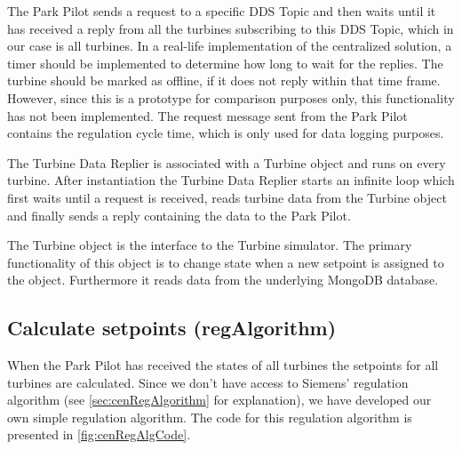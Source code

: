 The Park Pilot sends a request to a specific DDS Topic and then waits until it has received a reply from all the turbines subscribing to this DDS Topic, which in our case is all turbines. In a real-life implementation of the centralized solution, a timer should be implemented to determine how long to wait for the replies. The turbine should be marked as offline, if it does not reply within that time frame. However, since this is a prototype for comparison purposes only, this functionality has not been implemented. The request message sent from the Park Pilot contains the regulation cycle time, which is only used for data logging purposes.

The Turbine Data Replier is associated with a Turbine object and runs on every turbine. After instantiation the Turbine Data Replier starts an infinite loop which first waits until a request is received, reads turbine data from the Turbine object and finally sends a reply containing the data to the Park Pilot. 

The Turbine object is the interface to the Turbine simulator. The primary functionality of this object is to change state when a new setpoint is assigned to the object. Furthermore it reads data from the underlying MongoDB database. 

\subsection{Calculate setpoints (regAlgorithm)}\label{sec:calculateSetpoints}

When the Park Pilot has received the states of all turbines the setpoints for all turbines are calculated. Since we don't have access to Siemens' regulation algorithm (see \cref{sec:cenRegAlgorithm} for explanation), we have developed our own simple regulation algorithm. The code for this regulation algorithm is presented in \cref{fig:cenRegAlgCode}.

